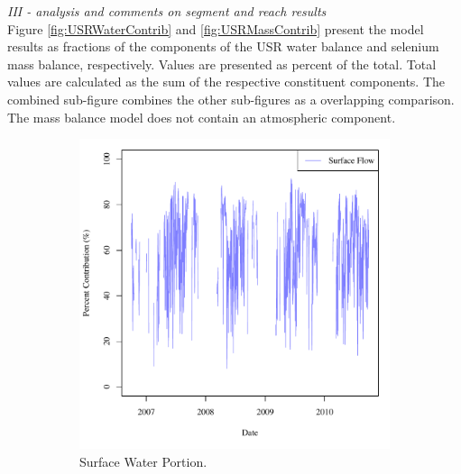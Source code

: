 \begin{linenumbers}
\emph{III - analysis and comments on segment and reach results}\\

Figure \ref{fig:USRWaterContrib} and \ref{fig:USRMassContrib} present the model results as fractions of the components of the USR water balance and selenium mass balance, respectively.  Values are presented as percent of the total.  Total values are calculated as the sum of the respective constituent components.  The combined sub-figure combines the other sub-figures as a overlapping comparison.  The mass balance model does not contain an atmospheric component.

\begin{figure}[htbp]
\centering
	\begin{subfigure}{0.5\textwidth}
		\centering
		\includegraphics[width=0.9\linewidth]{"Figures/Results_USR/M Water Contrib 1"}
		\caption{Surface Water Portion.}
		\label{sub:USRWSurf}
	\end{subfigure}%
	\begin{subfigure}{0.5\textwidth}
		\centering

\end{subfigure}
\end{figure}
\end{linenumbers}
